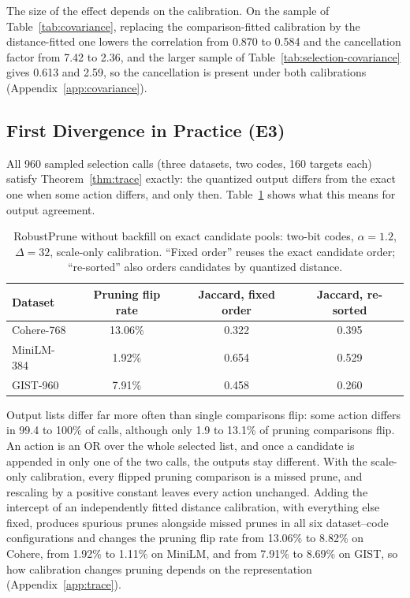 \documentclass[twoside,11pt]{article}
\begin{document}
The size of the effect depends on the calibration. On the sample of Table~\ref{tab:covariance}, replacing the comparison-fitted calibration by the distance-fitted one lowers the correlation from 0.870 to 0.584 and the cancellation factor from 7.42 to 2.36, and the larger sample of Table~\ref{tab:selection-covariance} gives 0.613 and 2.59, so the cancellation is present under both calibrations (Appendix~\ref{app:covariance}).

\subsection{First Divergence in Practice (E3)}
\label{sec:exp-trace}

All 960 sampled selection calls (three datasets, two codes, 160 targets each) satisfy Theorem~\ref{thm:trace} exactly: the quantized output differs from the exact one when some action differs, and only then. Table~\ref{tab:trace} shows what this means for output agreement.

\begin{table}[tbp]
\centering


\begin{tabular}{lccc}
\toprule
Dataset & Pruning flip rate & Jaccard, fixed order & Jaccard, re-sorted \\
\midrule
Cohere-768 & 13.06\% & 0.322 & 0.395 \\
MiniLM-384 & 1.92\% & 0.654 & 0.529 \\
GIST-960 & 7.91\% & 0.458 & 0.260 \\
\bottomrule
\end{tabular}

\small
\caption{RobustPrune without backfill on exact candidate pools: two-bit codes, $\alpha=1.2$, $\Delta=32$, scale-only calibration. ``Fixed order'' reuses the exact candidate order; ``re-sorted'' also orders candidates by quantized distance.}
\label{tab:trace}
\end{table}

Output lists differ far more often than single comparisons flip: some action differs in 99.4 to 100\% of calls, although only 1.9 to 13.1\% of pruning comparisons flip. An action is an OR over the whole selected list, and once a candidate is appended in only one of the two calls, the outputs stay different. With the scale-only calibration, every flipped pruning comparison is a missed prune, and rescaling by a positive constant leaves every action unchanged. Adding the intercept of an independently fitted distance calibration, with everything else fixed, produces spurious prunes alongside missed prunes in all six dataset--code configurations and changes the pruning flip rate from 13.06\% to 8.82\% on Cohere, from 1.92\% to 1.11\% on MiniLM, and from 7.91\% to 8.69\% on GIST, so how calibration changes pruning depends on the representation (Appendix~\ref{app:trace}).
\end{document}
